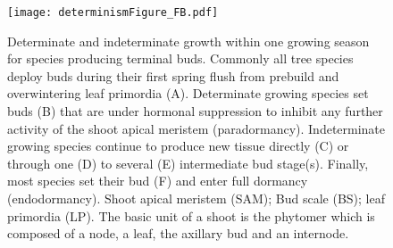\documentclass{article}
\begin{document}
								\begin{figure}
								\centering
								\texttt{[image: determinismFigure\_FB.pdf]} 
								\caption{Determinate and indeterminate growth within one growing season for species producing terminal buds. Commonly all tree species deploy buds during their first spring flush from prebuild and overwintering leaf primordia (A). Determinate growing species set buds (B) that are under hormonal suppression to inhibit any further activity of the shoot apical meristem (paradormancy). Indeterminate growing species continue to produce new tissue directly (C) or through one (D) to several (E) intermediate bud stage(s). Finally, most species set their bud (F) and enter full dormancy (endodormancy). Shoot apical meristem (SAM); Bud scale (BS); leaf primordia (LP). The basic unit of a shoot is the phytomer which is composed of a node, a leaf, the axillary bud and an internode.}
								\label{fig:fig_2xxx}
								\end{figure}
		
\end{document}
